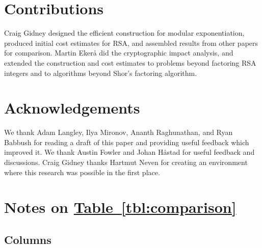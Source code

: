 \documentclass[a4paper, onecolumn, accepted=2021-03-29]{quantumarticle}
\newcommand{\tbl}[1]{\hyperref[tbl:#1]{Table~\ref*{tbl:#1}}}
\begin{document}
\section*{Contributions}
Craig Gidney designed the efficient construction for modular exponentiation, produced initial cost estimates for RSA, and assembled results from other papers for comparison.
Martin Ekerå did the cryptographic impact analysis, and extended the construction and cost estimates to problems beyond factoring RSA integers and to algorithms beyond Shor's factoring algorithm.

\section*{Acknowledgements}
We thank Adam Langley, Ilya Mironov, Ananth Raghunathan, and Ryan Babbush for reading a draft of this paper and providing useful feedback which improved it.
We thank Austin Fowler and Johan Håstad for useful feedback and discussions.
Craig Gidney thanks Hartmut Neven for creating an environment where this research was possible in the first place.


\appendix

\section{Notes on \texorpdfstring{\tbl{comparison}}{Table I}}
\label{app:table-details}

\subsection{Columns}
\end{document}

